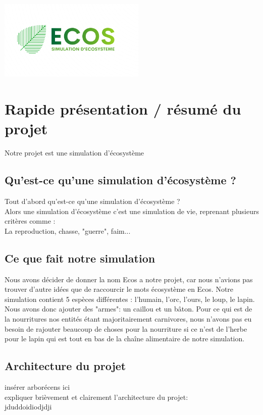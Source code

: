 \documentclass[a4paper, 11pt]{article}
\title{}
\author{CHAMPENOIS Brandon \textsc{G5B} \\ BONVARLET Bastien \textsc{G5B} \\ MASSON Joris \textsc{G5B} }
\begin{document}
\maketitle
\centerline{\includegraphics[width = 7cm]{images/ecos.png}}
\tableofcontents
\newpage

\section{Rapide présentation / résumé du projet}
Notre projet est une simulation d'écosystème\\

\subsection*{Qu'est-ce qu'une simulation d'écosystème ?}
Tout d'abord qu'est-ce qu'une simulation d'écosystème ?\\
Alors une simulation d'écosystème c'est une simulation de vie, reprenant plusieurs critères comme :\\
La reproduction, chasse, "guerre", faim...\\

\subsection{Ce que fait notre simulation}
Nous avons décider de donner la nom Ecos a notre projet, car nous n'avions pas trouver d'autre idées que de raccourcir le mots écosystème en Ecos. Notre simulation contient 5 espèces différentes : l'humain, l'orc, l'ours, le loup, le lapin. Nous avons donc ajouter des "armes": un caillou et un bâton. Pour ce qui est de la nourritures nos entités étant majoritairement carnivores, nous n'avons pas eu besoin de rajouter beaucoup de choses pour la nourriture si ce n'est de l'herbe pour le lapin qui est tout en bas de la chaîne alimentaire de notre simulation.\\

\subsection{Architecture du projet}
insérer arborécens ici\\
expliquer brièvement et clairement l'architecture du projet: \\
jduddoidiodjdji\\
\end{document}
